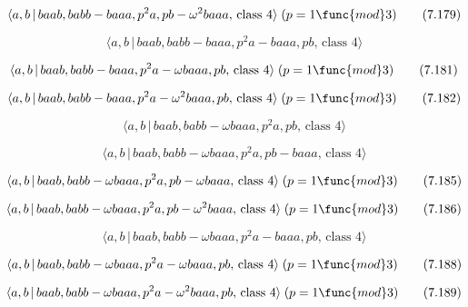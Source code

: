 \documentclass[10pt]{article}
\begin{document}
\begin{equation}
\langle a,b\,|\,baab,babb-baaa,p^{2}a,pb-\omega ^{2}baaa,\,\text{class }%
4\rangle \;(p=1\func{mod}3)  \tag{7.179}
\end{equation}

\begin{equation}
\langle a,b\,|\,baab,babb-baaa,p^2a-baaa,pb,\,\text{class }4\rangle 
\tag{7.180}
\end{equation}

\begin{equation}
\langle a,b\,|\,baab,babb-baaa,p^{2}a-\omega baaa,pb,\,\text{class }4\rangle
\;(p=1\func{mod}3)  \tag{7.181}
\end{equation}

\begin{equation}
\langle a,b\,|\,baab,babb-baaa,p^{2}a-\omega ^{2}baaa,pb,\,\text{class }%
4\rangle \;(p=1\func{mod}3)  \tag{7.182}
\end{equation}

\begin{equation}
\langle a,b\,|\,baab,babb-\omega baaa,p^{2}a,pb,\,\text{class }4\rangle 
\tag{7.183}
\end{equation}

\begin{equation}
\langle a,b\,|\,baab,babb-\omega baaa,p^{2}a,pb-baaa,\,\text{class }4\rangle
\tag{7.184}
\end{equation}

\begin{equation}
\langle a,b\,|\,baab,babb-\omega baaa,p^{2}a,pb-\omega baaa,\,\text{class }%
4\rangle \;(p=1\func{mod}3)  \tag{7.185}
\end{equation}

\begin{equation}
\langle a,b\,|\,baab,babb-\omega baaa,p^{2}a,pb-\omega ^{2}baaa,\,\text{%
class }4\rangle \;(p=1\func{mod}3)  \tag{7.186}
\end{equation}

\begin{equation}
\langle a,b\,|\,baab,babb-\omega baaa,p^{2}a-baaa,pb,\,\text{class }4\rangle
\tag{7.187}
\end{equation}

\begin{equation}
\langle a,b\,|\,baab,babb-\omega baaa,p^{2}a-\omega baaa,pb,\,\text{class }%
4\rangle \;(p=1\func{mod}3)  \tag{7.188}
\end{equation}

\begin{equation}
\langle a,b\,|\,baab,babb-\omega baaa,p^{2}a-\omega ^{2}baaa,pb,\,\text{%
class }4\rangle \;(p=1\func{mod}3)  \tag{7.189}
\end{equation}
\end{document}
